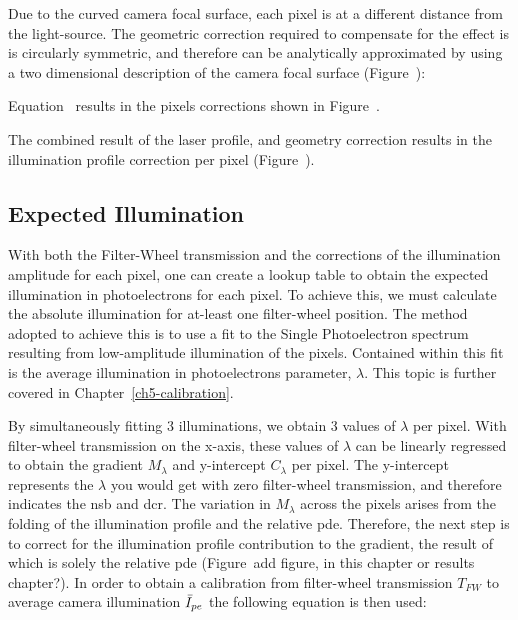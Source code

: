 Due to the curved camera focal surface, each pixel is at a different distance from the light-source. The geometric correction required to compensate for the effect is is circularly symmetric, and therefore can be analytically approximated by using a two dimensional description of the camera focal surface (Figure~):


Equation~ results in the pixels corrections shown in Figure~.

The combined result of the laser profile, and geometry correction results in the illumination profile correction per pixel (Figure~).

\subsection{Expected Illumination}

With both the Filter-Wheel transmission and the corrections of the illumination amplitude for each pixel, one can create a lookup table to obtain the expected illumination in photoelectrons for each pixel. To achieve this, we must calculate the absolute illumination for at-least one filter-wheel position. The method adopted to achieve this is to use a fit to the Single Photoelectron spectrum resulting from low-amplitude illumination of the pixels. Contained within this fit is the average illumination in photoelectrons parameter, $\lambda$. This topic is further covered in Chapter~\ref{ch5-calibration}. 

By simultaneously fitting 3 illuminations, we obtain 3 values of $\lambda$ per pixel. With filter-wheel transmission on the x-axis, these values of $\lambda$ can be linearly regressed to obtain the gradient $M_\lambda$ and y-intercept $C_\lambda$ per pixel. The y-intercept represents the $\lambda$ you would get with zero filter-wheel transmission, and therefore indicates the \gls{nsb} and \gls{dcr}. The variation in $M_\lambda$ across the pixels arises from the folding of the illumination profile and the relative \gls{pde}. Therefore, the next step is to correct for the illumination profile contribution to the gradient, the result of which is solely the relative \gls{pde} (Figure~{add figure, in this chapter or results chapter?}). In order to obtain a calibration from filter-wheel transmission $T_{FW}$ to average camera illumination $\bar{I}_{pe}$ the following equation is then used:

